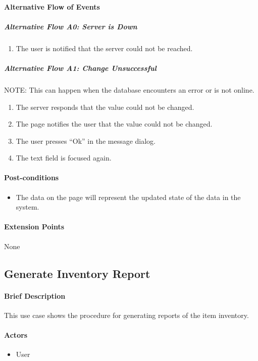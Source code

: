 \documentclass{article}
\begin{document}
\paragraph{Alternative Flow of Events}

\subparagraph{Alternative Flow A0: Server is Down}
\begin{enumerate}
\item The user is notified that the server could not be reached.
\end{enumerate}

\subparagraph{Alternative Flow A1: Change Unsuccessful}
NOTE: This can happen when the database encounters an error or is not online.
\begin{enumerate}
\item The server responds that the value could not be changed.
\item The page notifies the user that the value could not be changed.
\item The user presses ``Ok'' in the message dialog.
\item The text field is focused again.
\end{enumerate}

\paragraph{Post-conditions}
\begin{itemize}
\item The data on the page will represent the updated state of the data in the system.
\end{itemize}

\paragraph{Extension Points}
None

\subsection{Generate Inventory Report}

\paragraph{Brief Description}
This use case shows the procedure for generating reports of the item inventory.

\paragraph{Actors}
\begin{itemize}
\item User
\end{itemize}
\end{document}

